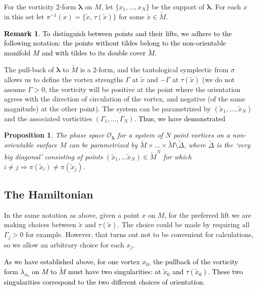 \documentclass[11pt,twoside]{article}
\newtheorem{prop}[theorem]{Proposition}
\theoremstyle{definition}
\newtheorem{rem}[theorem]{Remark}
\numberwithin{equation}{section}
\def\Mt{\widetilde{M}}
\def\xt{\tilde{x}}
\def\blambda{{\boldsymbol\lambda}}
\begin{document}
 For the vorticity 2-form $\blambda$ on $M$, let $\{x_1,\dots,x_N\}$ be the support of $\blambda$. For each $x$ in this set let $\pi^{-1}(x)= \{\xt,\,\tau(\xt)\}$ for some $\xt\in\Mt$. 

 \textcolor{black}{\begin{rem}To distinguish between points and their lifts, we adhere to the following notation: the points without tildes belong to the non-orientable manifold $M$ and with tildes to its double cover $\Mt$.\end{rem}}
 
 The pull-back of $\blambda$ to $\Mt$ is a 2-form, and the tautological symplectic from $\sigma$ allows us to define the vortex strengths $\Gamma$ at $\xt$ and $-\Gamma$ at $\tau(\xt)$ (we do not assume $\Gamma>0$, the vorticity will be positive at the point where the orientation agrees with the direction of circulation of the vortex, and negative (of the same magnitude) at the other point).  The system can be parametrized by 
$(\xt_1,\dots,\xt_N)$ and the associated vorticities $(\Gamma_1,\dots,\Gamma_N)$. \textcolor{black}{Thus, we have demonstrated}

\begin{prop}\label{prop:phase space}
The phase space $\mathcal{O}_\blambda$ for a system of $N$ point vortices on a non-orientable surface $M$ can be parametrized by
$\Mt\times\dots\times\Mt\setminus\widetilde{\Delta}$, where $\widetilde{\Delta}$ is the `very big diagonal' consisting of points $(\xt_1,\dots\xt_N)\in\Mt^N$ for which $i\neq j\Rightarrow \pi(\xt_i)\neq\pi(\xt_j)$. 
\end{prop}




\subsection{The Hamiltonian}
\label{sec: the Hamiltonian}
In the same notation as above, given a point  $x$ on $M$, for the preferred lift we are making choices between $\xt$ and $\tau(\xt)$. The choice could be made by requiring all $\Gamma_j>0$ for example. However, that turns out not to be convenient for calculations, so we allow an arbitrary choice for each $x_j$.


\textcolor{black}{As we have established above, for one vortex $x_0$, the pullback of the vorticity form $\lambda_{x_0}$ on $M$ to $\Mt$ must have two singularities: at $\xt_0$ and $\tau(\xt_0)$. These two  singularities correspond to the two different choices of orientation.}
\end{document}
